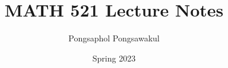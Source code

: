 \documentclass[11pt,titlepage=false]{scrreprt}
\begin{document}
\setlength{\textheight}{8.5in}
\setlength{\parskip}{2ex plus 0.5ex minus 0.2ex}
\setlength{\parindent}{0pt}


\title{MATH 521 Lecture Notes}
\author{Pongsaphol Pongsawakul}
\date{Spring 2023}
\maketitle
\tableofcontents


% 
% 






% 
% 

% 
% 
\end{document}

